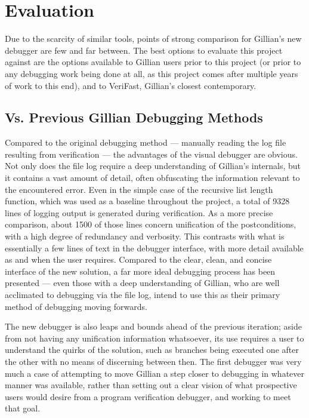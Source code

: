 
\chapter{Evaluation}\label{sec:eval}

Due to the scarcity of similar tools, points of strong comparison for Gillian's
new debugger are few and far between. The best options to evaluate this project
against are the options available to Gillian users prior to this project (or
prior to any debugging work being done at all, as this project comes after
multiple years of work to this end), and to VeriFast, Gillian's closest
contemporary.

\section{Vs. Previous Gillian Debugging Methods}

Compared to the original debugging method --- manually reading the log file
resulting from verification --- the advantages of the visual debugger are
obvious. Not only does the file log require a deep understanding of Gillian's
internals, but it contains a vast amount of detail, often obfuscating the
information relevant to the encountered error. 
Even in the simple case of the recursive list length function, which was used as
a baseline throughout the project, a total of 9328 lines of logging output is
generated during verification. As a more precise comparison, about 1500 of those
lines concern unification of the postconditions, with a high degree of
redundancy and verbosity. This contrasts with what is essentially a few lines of
text in the debugger interface, with more detail available as and when the user
requires. Compared to the clear, clean, and concise interface of the new
solution, a far more ideal debugging process has been presented --- even those
with a deep understanding of Gillian, who are well acclimated to debugging via
the file log, intend to use this as their primary method of debugging moving
forwards.

The new debugger is also leaps and bounds ahead of the previous iteration;
aside from not having any unification information whatsoever, its use requires
a user to understand the quirks of the solution, such as branches being executed
one after the other with no means of discerning between then. The first debugger
was very much a case of attempting to move Gillian a step closer to debugging in
whatever manner was available, rather than setting out a clear vision of what
prospective users would desire from a program verification debugger, and working
to meet that goal.


